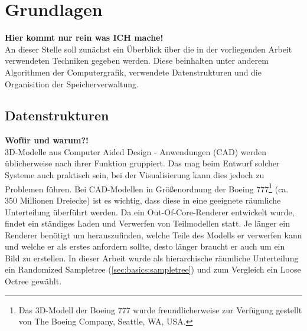 \chapter{Grundlagen}
\label{chap:basics}
%
%
%
\textbf{Hier kommt nur rein was ICH mache!}\\
An dieser Stelle soll zunächst ein Überblick über die in der vorliegenden Arbeit verwendeten Techniken gegeben werden. Diese beinhalten unter anderem Algorithmen der Computergrafik, verwendete Datenstrukturen und die Organisition der Speicherverwaltung.

\section{Datenstrukturen}
\label{sec:basics:datenstrukturen}
\textbf{Wofür und warum?!}\\
3D-Modelle aus Computer Aided Design - Anwendungen (CAD) werden üblicherweise nach ihrer Funktion gruppiert. Das mag beim Entwurf solcher Systeme auch praktisch sein, bei der Visualisierung kann dies jedoch zu Problemen führen. Bei CAD-Modellen in Größenordnung der Boeing 777\footnote{%
Das 3D-Modell der Boeing 777 wurde freundlicherweise zur Verfügung gestellt von The Boeing Company, Seattle, WA, USA.} (ca. 350 Millionen Dreiecke) ist es wichtig, dass diese in eine geeignete räumliche Unterteilung überführt werden. Da ein Out-Of-Core-Renderer entwickelt wurde, findet ein ständiges Laden und Verwerfen von Teilmodellen statt. Je länger ein Renderer benötigt um herauszufinden, welche Teile des Modells er verwerfen kann und welche er als erstes anfordern sollte, desto länger braucht er auch um ein Bild zu erstellen. In dieser Arbeit wurde als hierarchische räumliche Unterteilung ein Randomized Sampletree (\ref{sec:basics:sampletree}) und zum Vergleich ein Loose Octree gewählt.

